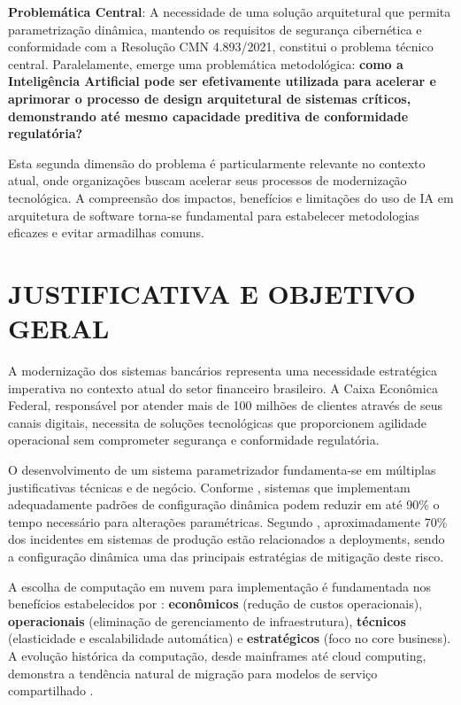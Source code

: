 \textbf{Problemática Central}: A necessidade de uma solução arquitetural que permita parametrização dinâmica, mantendo os requisitos de segurança cibernética e conformidade com a Resolução CMN 4.893/2021, constitui o problema técnico central. Paralelamente, emerge uma problemática metodológica: \textbf{como a Inteligência Artificial pode ser efetivamente utilizada para acelerar e aprimorar o processo de design arquitetural de sistemas críticos, demonstrando até mesmo capacidade preditiva de conformidade regulatória?}

Esta segunda dimensão do problema é particularmente relevante no contexto atual, onde organizações buscam acelerar seus processos de modernização tecnológica. A compreensão dos impactos, benefícios e limitações do uso de IA em arquitetura de software torna-se fundamental para estabelecer metodologias eficazes e evitar armadilhas comuns.

\chapter{JUSTIFICATIVA E OBJETIVO GERAL}

A modernização dos sistemas bancários representa uma necessidade estratégica imperativa no contexto atual do setor financeiro brasileiro. A Caixa Econômica Federal, responsável por atender mais de 100 milhões de clientes através de seus canais digitais, necessita de soluções tecnológicas que proporcionem agilidade operacional sem comprometer segurança e conformidade regulatória.

O desenvolvimento de um sistema parametrizador fundamenta-se em múltiplas justificativas técnicas e de negócio. Conforme , sistemas que implementam adequadamente padrões de configuração dinâmica podem reduzir em até 90\% o tempo necessário para alterações paramétricas. Segundo , aproximadamente 70\% dos incidentes em sistemas de produção estão relacionados a deployments, sendo a configuração dinâmica uma das principais estratégias de mitigação deste risco.

A escolha de computação em nuvem para implementação é fundamentada nos benefícios estabelecidos por : \textbf{econômicos} (redução de custos operacionais), \textbf{operacionais} (eliminação de gerenciamento de infraestrutura), \textbf{técnicos} (elasticidade e escalabilidade automática) e \textbf{estratégicos} (foco no core business). A evolução histórica da computação, desde mainframes até cloud computing, demonstra a tendência natural de migração para modelos de serviço compartilhado .

